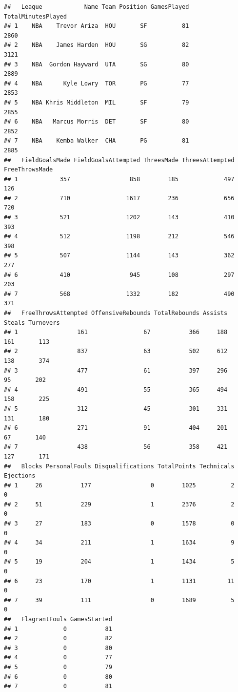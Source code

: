 \documentclass[]{book}
\theoremstyle{definition}
\theoremstyle{definition}
\theoremstyle{remark}
\begin{document}
\begin{verbatim}
##   League            Name Team Position GamesPlayed TotalMinutesPlayed
## 1    NBA    Trevor Ariza  HOU       SF          81               2860
## 2    NBA    James Harden  HOU       SG          82               3121
## 3    NBA  Gordon Hayward  UTA       SG          80               2889
## 4    NBA      Kyle Lowry  TOR       PG          77               2853
## 5    NBA Khris Middleton  MIL       SF          79               2855
## 6    NBA   Marcus Morris  DET       SF          80               2852
## 7    NBA    Kemba Walker  CHA       PG          81               2885
##   FieldGoalsMade FieldGoalsAttempted ThreesMade ThreesAttempted FreeThrowsMade
## 1            357                 858        185             497            126
## 2            710                1617        236             656            720
## 3            521                1202        143             410            393
## 4            512                1198        212             546            398
## 5            507                1144        143             362            277
## 6            410                 945        108             297            203
## 7            568                1332        182             490            371
##   FreeThrowsAttempted OffensiveRebounds TotalRebounds Assists Steals Turnovers
## 1                 161                67           366     188    161       113
## 2                 837                63           502     612    138       374
## 3                 477                61           397     296     95       202
## 4                 491                55           365     494    158       225
## 5                 312                45           301     331    131       180
## 6                 271                91           404     201     67       140
## 7                 438                56           358     421    127       171
##   Blocks PersonalFouls Disqualifications TotalPoints Technicals Ejections
## 1     26           177                 0        1025          2         0
## 2     51           229                 1        2376          2         0
## 3     27           183                 0        1578          0         0
## 4     34           211                 1        1634          9         0
## 5     19           204                 1        1434          5         0
## 6     23           170                 1        1131         11         0
## 7     39           111                 0        1689          5         0
##   FlagrantFouls GamesStarted
## 1             0           81
## 2             0           82
## 3             0           80
## 4             0           77
## 5             0           79
## 6             0           80
## 7             0           81
\end{verbatim}
\end{document}
